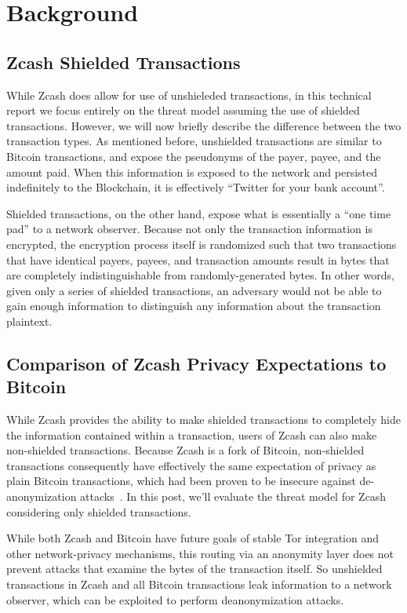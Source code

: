 \documentclass{article}
\begin{document}
\section{Background} \label{background}

\subsection{Zcash Shielded Transactions}
\label{shielded}

While Zcash does allow for use of unshieleded transactions, in this technical
report we focus entirely on the threat model assuming the use of shielded
transactions. However, we will now briefly describe
the difference between the two transaction types.
As mentioned before, unshielded transactions are similar
to Bitcoin transactions, and expose the pseudonyms of the payer, payee, and the
amount paid. When this information is exposed to the network and persisted
indefinitely to the Blockchain, it is effectively “Twitter for your bank
account”.

Shielded transactions, on the other hand, expose what is essentially a “one
time pad” to a network observer. Because not only the transaction information
is encrypted, the encryption process itself is randomized such that two
transactions that have identical payers, payees, and transaction amounts result
in bytes that are completely indistinguishable from randomly-generated bytes.
In other words, given only a series of shielded transactions, an adversary
would not be able to gain enough information to distinguish any information
about the transaction plaintext.


\subsection{Comparison of Zcash Privacy Expectations to Bitcoin}

While Zcash provides the ability to make shielded transactions to completely
hide the information contained within a transaction, users of Zcash can also
make non-shielded transactions. Because Zcash is a fork of Bitcoin,
non-shielded transactions consequently have effectively the same expectation of
privacy as plain Bitcoin transactions, which had been proven to be insecure
against de-anonymization attacks~\cite{anon-bitcoin}. In this post, we’ll
evaluate the threat model for Zcash considering only shielded transactions.

While both Zcash and Bitcoin have future goals of
stable Tor integration and other network-privacy mechanisms, this routing via
an anonymity layer does not prevent attacks that examine the bytes of the
transaction itself. So unshielded transactions in Zcash and all Bitcoin
transactions leak information to a network observer, which can be exploited to
perform deanonymization attacks.
\end{document}
